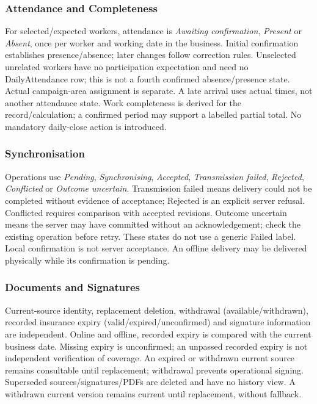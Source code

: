 \subsubsection{Attendance and Completeness}
For selected/expected workers, attendance is \textit{Awaiting confirmation},
\textit{Present} or \textit{Absent},
once per worker and working date in the business. Initial confirmation establishes
presence/absence; later changes follow correction rules. Unselected unrelated workers have no participation expectation and need no
DailyAttendance row; this is not a fourth confirmed absence/presence state.
Actual campaign-area assignment is separate. A late arrival uses actual times, not another attendance state.
Work completeness is derived for the record/calculation; a confirmed period may
support a labelled partial total. No mandatory daily-close action is introduced.

\subsubsection{Synchronisation}\label{sec:sync-states}
Operations use \textit{Pending}, \textit{Synchronising}, \textit{Accepted},
\textit{Transmission failed}, \textit{Rejected}, \textit{Conflicted} or
\textit{Outcome uncertain}. Transmission failed means delivery could not be
completed without evidence of acceptance; Rejected is an explicit server refusal.
Conflicted requires comparison with accepted revisions. Outcome uncertain means
the server may have committed without an acknowledgement; check the existing
operation before retry. These states do not use a generic Failed label. Local confirmation is not server acceptance. An offline delivery
may be delivered physically while its confirmation is pending.

\subsubsection{Documents and Signatures}
Current-source identity, replacement deletion,
withdrawal (available/withdrawn), recorded insurance expiry
(valid/expired/unconfirmed) and signature information are independent.
Online and offline, recorded expiry is compared with the current business date.
Missing expiry is unconfirmed; an unpassed recorded expiry is not independent
verification of coverage. An expired or withdrawn current source remains consultable until replacement; withdrawal prevents operational signing. Superseded sources/signatures/PDFs are deleted and have no history view. A withdrawn current version
remains current until replacement, without fallback.

